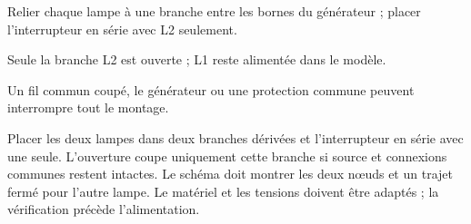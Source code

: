 \par\noindent\begin{minipage}{\linewidth}
\label{cor-defi-13}\begin{questions}
\item Relier chaque lampe à une branche entre les bornes du générateur ; placer l’interrupteur en série avec L2 seulement.
\item Seule la branche L2 est ouverte ; L1 reste alimentée dans le modèle.
\item Un fil commun coupé, le générateur ou une protection commune peuvent interrompre tout le montage.
\end{questions}
\end{minipage}
\par\noindent\begin{minipage}{\linewidth}
\label{cor-activite-13}
Placer les deux lampes dans deux branches dérivées et l’interrupteur en série avec une seule. L’ouverture coupe uniquement cette branche si source et connexions communes restent intactes. Le schéma doit montrer les deux nœuds et un trajet fermé pour l’autre lampe. Le matériel et les tensions doivent être adaptés ; la vérification précède l’alimentation.\par\end{minipage}

